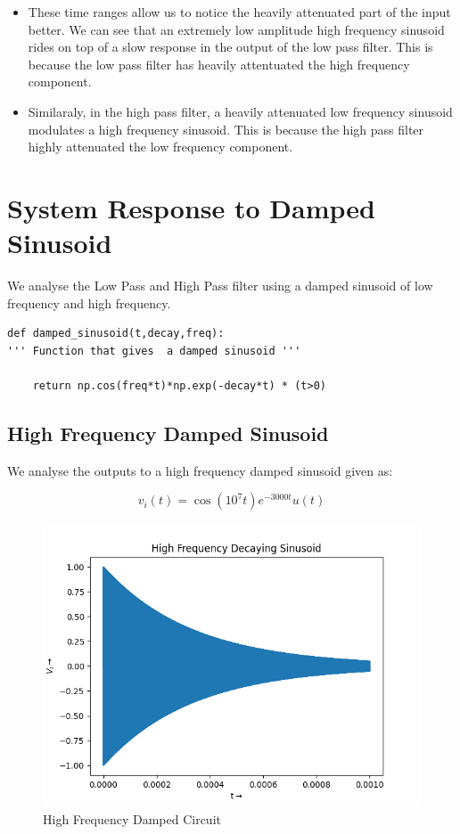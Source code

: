 \documentclass{article}
\begin{document}
\begin{itemize}

    \item
      These time ranges allow us to notice the heavily attenuated part of
      the input better. We can see that an extremely low amplitude high
      frequency sinusoid rides on top of a slow response in the output of
      the low pass filter. This is because the low pass filter has heavily
      attentuated the high frequency component.
    \item
      Similaraly, in the high pass filter, a heavily attenuated low
      frequency sinusoid modulates a high frequency sinusoid. This is
      because the high pass filter highly attenuated the low frequency
      component.

\end{itemize}

\section*{System Response to Damped Sinusoid}

We analyse the Low Pass and High Pass filter using a damped
sinusoid of low frequency and high frequency.

\begin{lstlisting}
def damped_sinusoid(t,decay,freq):
''' Function that gives  a damped sinusoid '''

    return np.cos(freq*t)*np.exp(-decay*t) * (t>0)

\end{lstlisting}

\subsection*{High Frequency Damped Sinusoid}
We analyse the outputs to a high frequency damped sinusoid given as:

\[v_i(t) = \cos(10^7 t) e^{-3000t} u(t)\]

\begin{figure}[!tbh]
    \centering
    \includegraphics[scale=0.5]{plots/High Frequency Decaying Sinusoid.png}   
    \caption{High Frequency Damped Circuit}
\end{figure}
\end{document}
